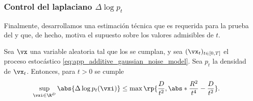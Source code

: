 \documentclass[../../book-main_es.tex]{subfiles}
\begin{document}
\subsubsection{Control del laplaciano \(\Delta \log p_{t}\)}

Finalmente, desarrollamos una estimación técnica que es requerida para 
la prueba del  y que, de hecho, motiva 
el supuesto sobre los valores admisibles de \(t\).

\begin{lemma}\label{lem:app_diffusion_laplacian_control}
    Sea \(\vx\) una variable aleatoria tal que los
    se cumplan, y sea \((\vx_{t})_{t \in [0, T]}\) el proceso estocástico
    \eqref{eq:app_additive_gaussian_noise_model}. Sea
    \(p_{t}\) la densidad de \(\vx_{t}\). Entonces, para \(t > 0\) se cumple
    \begin{equation}
        \sup_{\vxi \in \R^{D}}\abs{\Delta \log p_{t}(\vxi)} \leq
        \max\rp{\frac{D}{t^{2}}, \abs*{\frac{R^{2}}{t^{4}} - \frac{D}{t^{2}}}}.
    \end{equation}
\end{lemma}
\end{document}

